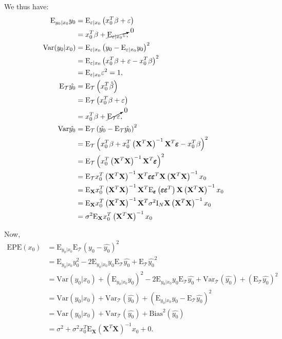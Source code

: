 \documentclass{article}
\begin{document}
We thus have:
\begin{align}
	\mathrm E_{y_0|x_0}y_0&=\mathrm E_{\varepsilon|x_0}\left(x_0^T\beta+\varepsilon\right)\\
	&=x_0^T\beta+\cancelto{0}{\mathrm E_{\varepsilon|x_0}\varepsilon},\\
	\mathrm{Var}(y_0|x_0)&=\mathrm E_{\varepsilon|x_0}\left(y_0-\mathrm E_{\varepsilon|x_0}y_0\right)^2\\
	&=\mathrm E_{\varepsilon|x_0}\left(x_0^T\beta+\varepsilon-x_0^T\beta\right)^2\\
	&=\mathrm E_{\varepsilon|x_0}\varepsilon^2=1,\\
	\mathrm E_{\mathcal T}\hat{y_0}&=\mathrm E_{\mathcal T}\left(x_0^T\hat{\beta}\right)\\
	&=\mathrm E_{\mathcal T}\left(x_0^T\beta+\varepsilon\right)\\
	&=x_0^T\beta+\cancelto{0}{\mathrm E_{\mathcal T}\varepsilon},\\
	\mathrm{Var}\hat{y_0}&=\mathrm E_{\mathcal T}\left(\hat{y_0}-\mathrm E_{\mathcal T}\hat{y_0}\right)^2\\
	&=\mathrm E_{\mathcal T}\left(x_0^T\beta+x_0^T\left(\mathbf X^T\mathbf X\right)^{-1}\mathbf X^T\pmb\varepsilon-x_0^T\beta\right)^2\\
	&=\mathrm E_{\mathcal T}\left(x_0^T\left(\mathbf X^T\mathbf X\right)^{-1}\mathbf X^T\pmb\varepsilon\right)^2\\
	&=\mathrm E_{\mathcal T}x_0^T\left(\mathbf X^T\mathbf X\right)^{-1}\mathbf X^T\pmb\varepsilon\pmb\varepsilon^T\mathbf X\left(\mathbf X^T\mathbf X\right)^{-1}x_0\\
	&=\mathrm E_{\mathbf X}x_0^T\left(\mathbf X^T\mathbf X\right)^{-1}\mathbf X^T\mathrm E_{\pmb\varepsilon}\left(\pmb\varepsilon\pmb\varepsilon^T\right)\mathbf X\left(\mathbf X^T\mathbf X\right)^{-1}x_0\\
	&=\mathrm E_{\mathbf X}x_0^T\left(\mathbf X^T\mathbf X\right)^{-1}\mathbf X^T\sigma^2\mathrm I_N\mathbf X\left(\mathbf X^T\mathbf X\right)^{-1}x_0\\
	&=\sigma^2\mathrm E_{\mathbf X}x_0^T\left(\mathbf X^T\mathbf X\right)^{-1}x_0\\
\end{align}

Now,
\begin{align}
	\mathrm{EPE}(x_0)&=\mathrm E_{y_0|x_0}\mathrm E_{\mathcal T}\left(y_0-\hat{y_0}\right)^2\\
	&=\mathrm E_{y_0|x_0}y_0^2-2\mathrm E_{y_0|x_0}y_0\mathrm E_{\mathcal T}\hat{y_0}+\mathrm E_{\mathcal T}\hat{y_0}^2\\
	&=\mathrm{Var}(y_0|x_0)+\left(\mathrm E_{y_0|x_0}y_0\right)^2-2\mathrm E_{y_0|x_0}y_0\mathrm E_{\mathcal T}\hat{y_0}+\mathrm{Var}_{\mathcal T}(\hat{y_0})+\left(\mathrm E_{\mathcal T}\hat{y_0}\right)^2\\
	&=\mathrm{Var}(y_0|x_0)+\mathrm{Var}_{\mathcal T}(\hat{y_0})+\left(\mathrm E_{y_0|x_0}y_0-\mathrm E_{\mathcal T}\hat{y_0}\right)^2\\
	&=\mathrm{Var}(y_0|x_0)+\mathrm{Var}_{\mathcal T}(\hat{y_0})+\mathrm{Bias}^2(\hat{y_0})\\
	&=\sigma^2+\sigma^2x_0^T\mathrm E_{\mathbf X}(\mathbf X^T\mathbf X)^{-1}x_0+0.
\end{align}
\end{document}
